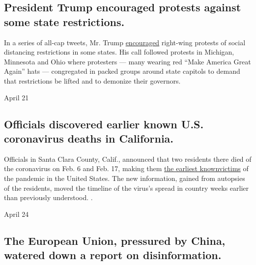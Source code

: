 \hypertarget{president-trump-encouraged-protests-against-some-state-restrictions}{%
\subsection{President Trump encouraged protests against some state
restrictions.}\label{president-trump-encouraged-protests-against-some-state-restrictions}}

In a series of all-cap tweets, Mr. Trump
\href{https://www.nytimes3xbfgragh.onion/2020/04/17/us/politics/trump-coronavirus-governors.html?action=click\&module=RelatedLinks\&pgtype=Article}{encouraged}
right-wing protests of social distancing restrictions in some states.
His call followed protests in Michigan, Minnesota and Ohio where
protesters --- many wearing red ``Make America Great Again'' hats ---
congregated in packed groups around state capitols to demand that
restrictions be lifted and to demonize their governors.

April 21

\hypertarget{officials-discovered-earlier-known-us-coronavirus-deaths-in-california}{%
\subsection{Officials discovered earlier known U.S. coronavirus deaths
in
California.}\label{officials-discovered-earlier-known-us-coronavirus-deaths-in-california}}

Officials in Santa Clara County, Calif., announced that two residents
there died of the coronavirus on Feb. 6 and Feb. 17, making them
\href{https://www.nytimes3xbfgragh.onion/2020/04/22/us/coronavirus-first-united-states-death.html}{the
earliest
known}\href{https://www.nytimes3xbfgragh.onion/2020/02/29/us/coronavirus-washington-death.html?action=click\&module=RelatedLinks\&pgtype=Article}{victims}
of the pandemic in the United States. The new information, gained from
autopsies of the residents, moved the timeline of the virus's spread in
country weeks earlier than previously understood. .

April 24

\hypertarget{the-european-union-pressured-by-china-watered-down-a-report-on-disinformation}{%
\subsection{The European Union, pressured by China, watered down a
report on
disinformation.}\label{the-european-union-pressured-by-china-watered-down-a-report-on-disinformation}}

